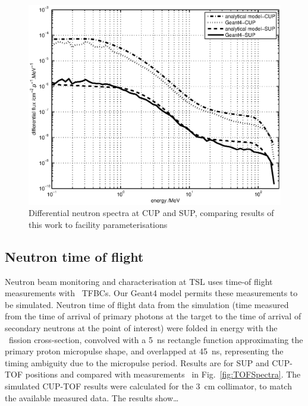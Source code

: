 \documentclass[11pt,a4paper]{IEEEtran}
\let\MYoriglatexcaption\caption
\renewcommand{\caption}[2][\relax]{\MYoriglatexcaption[#2]{#2}}
\def\U238{\BPChem{\^{238}U}}
\begin{document}
\begin{figure}[t]
    \centering
    \includegraphics[width=\columnwidth]{DiffYieldComparedSUPCUP10.eps}
    \caption{
        Differential neutron spectra at CUP and SUP, comparing results of this work to facility parameterisations~\cite{Prokofiev2009,Prokofiev14}
    }
    \label{fig:DifferentialSpectra}
\end{figure}

\subsection{Neutron time of flight}
Neutron beam monitoring and characterisation at TSL uses time-of flight measurements with \U238\ TFBCs.
Our Geant4 model permits these measurements to be simulated.
Neutron time of flight data from the simulation (time measured from the time of arrival of primary photons at the target to the time of arrival of secondary neutrons at the point of interest) were folded in energy with the \U238\ fission cross-section, convolved with a \SI{5}{\ns} rectangle function approximating the primary proton micropulse shape, and overlapped at \SI{45}{\ns}, representing the timing ambiguity due to the micropulse period.
Results are for SUP and CUP-TOF positions and compared with measurements~\cite{Prokofiev2009,Prokofiev14} in Fig.~\ref{fig:TOFSpectra}.
The simulated CUP-TOF results were calculated for the \SI{3}{\cm} collimator, to match the available measured data.
The results show\ldots
{}
\end{document}
